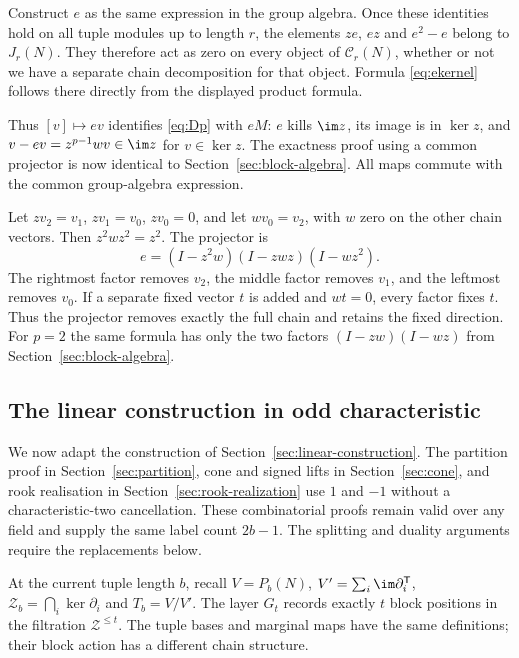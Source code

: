 Construct $e$ as the same expression in the group algebra. Once these identities hold on all tuple modules up to length $r$, the elements $ze$, $ez$ and $e^2-e$ belong to $J_r(N)$. They therefore act as zero on every object of $\mathcal C_r(N)$, whether or not we have a separate chain decomposition for that object. Formula \eqref{eq:ekernel} follows there directly from the displayed product formula.

Thus $[v]\mapsto ev$ identifies \eqref{eq:Dp} with $eM$: $e$ kills $\im z$, its image is in $\ker z$, and $v-ev=z^{p-1}wv\in\im z$ for $v\in\ker z$. The exactness proof using a common projector is now identical to Section~\ref{sec:block-algebra}. All maps commute with the common group-algebra expression.

\begin{example}
Let $zv_2=v_1$, $zv_1=v_0$, $zv_0=0$, and let $wv_0=v_2$, with $w$ zero on the other chain vectors. Then $z^2wz^2=z^2$. The projector is
\[e=(I-z^2w)(I-zwz)(I-wz^2).
\]
The rightmost factor removes $v_2$, the middle factor removes $v_1$, and the leftmost removes $v_0$. If a separate fixed vector $t$ is added and $wt=0$, every factor fixes $t$. Thus the projector removes exactly the full chain and retains the fixed direction. For $p=2$ the same formula has only the two factors $(I-zw)(I-wz)$ from Section~\ref{sec:block-algebra}.
\end{example}

\subsection{The linear construction in odd characteristic}\label{sec:oddlinear}
We now adapt the construction of Section~\ref{sec:linear-construction}.
The partition proof in Section~\ref{sec:partition}, cone and signed
lifts in Section~\ref{sec:cone}, and rook realisation in
Section~\ref{sec:rook-realization} use $1$ and $-1$ without a
characteristic-two cancellation. These combinatorial proofs remain
valid over any field and supply the same label count $2b-1$.
The splitting and duality arguments require the replacements below.

At the current tuple length $b$, recall $V=P_b(N)$,
$V'=\sum_i\im\partial_i^{\mathsf T}$,
$\mathcal Z_b=\bigcap_i\ker\partial_i$ and $T_b=V/V'$.
The layer $G_t$ records exactly $t$ block positions in the filtration
$\mathcal Z^{\le t}$. The tuple bases and marginal maps have the
same definitions; their block action has a different chain structure.

